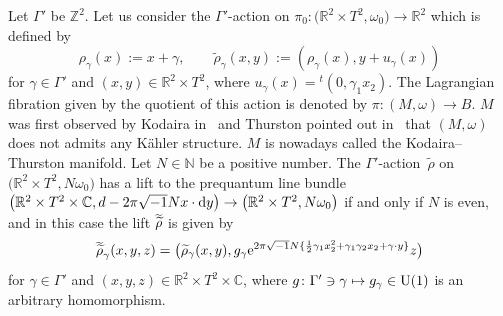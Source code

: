 \documentclass[10pt,a4paper]{amsart}
\numberwithin{equation}{section}
\newcommand{\C}{\mathbb{C}}
\newcommand{\R}{\mathbb{R}}
\newcommand{\Z}{\mathbb{Z}}
\newcommand{\N}{\mathbb{N}}
\renewcommand{\tilde}{\widetilde}
\newcommand{\vardbtilde}[1]{\tilde{\raisebox{0pt}[0.85\height]{$\tilde{#1}$}}}
\begin{document}
\begin{Example}\label{Kodaira--Thurston}
Let $\Gamma'$ be $\Z^2$. Let us consider the $\Gamma'$-action on $\pi_0\colon \bigl(\R^2\times T^2,\omega_0\bigr)\to \R^2$ which is defined by
\[
\rho_\gamma(x):=x+\gamma,\qquad \tilde \rho_\gamma (x,y):=(\rho_\gamma(x), y+u_\gamma (x))
\]
for $\gamma \in \Gamma'$ and $(x,y)\in \R^2\times T^2$, where $u_\gamma (x)={}^t(0,\gamma_1x_2)$. The Lagrangian fibration given by the quotient of this action is denoted by $\pi\colon (M,\omega)\to B$. $M$ was first observed by Kodaira in~\cite{Kodaira} and Thurston pointed out in~\cite{Thurston} that $(M,\omega)$ does not admits any K\"ahler structure. $M$ is nowadays called the Kodaira--Thurston manifold.
%
Let $N\in \N$ be a positive number. The $\Gamma'$-action~${\tilde \rho}$ on $\bigl(\R^2\times T^2, N\omega_0\bigr)$ has a lift to the prequantum line bundle $\bigl(\R^2\times T^2\times \C, d-2\pi\sqrt{-1}Nx\cdot {\rm d}y\bigr)\to \bigl(\R^2\times T^2,N\omega_0\bigr)$ if and only if $N$ is even, and in this case the lift ${\vardbtilde \rho}$ is given by
\[
{\vardbtilde \rho}_\gamma (x,y,z)=\bigl({\tilde \rho}_\gamma (x,y), g_\gamma {\rm e}^{2\pi\sqrt{-1}N\{\frac{1}{2}\gamma_1x_2^2+\gamma_1\gamma_2x_2+\gamma\cdot y\}}z\bigr)
\]
for $\gamma\in \Gamma'$ and $(x,y,z)\in \R^2\times T^2\times \C$, where $g\colon \Gamma' \ni \gamma\mapsto g_\gamma\in {\rm U}(1)$ is an arbitrary homomorphism.
\end{Example}
\end{document}
